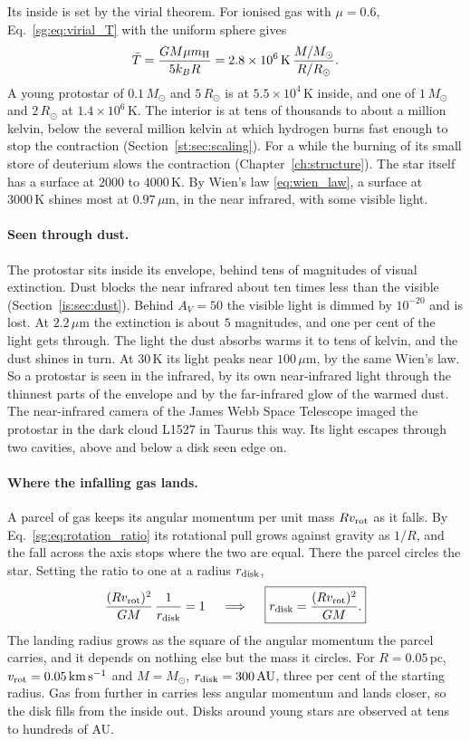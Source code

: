 Its inside is set by the virial theorem. For ionised gas with $\mu=0.6$, Eq.~\eqref{sg:eq:virial_T} with the uniform sphere gives
\[
\bar T=\frac{GM\mu m_{\rm H}}{5k_BR}=2.8\times10^6\,\mathrm K\,\frac{M/M_\odot}{R/R_\odot}.
\]
A young protostar of $0.1\,M_\odot$ and $5\,R_\odot$ is at $5.5\times10^4\,\mathrm K$ inside, and one of $1\,M_\odot$ and $2\,R_\odot$ at $1.4\times10^6\,\mathrm K$. The interior is at tens of thousands to about a million kelvin, below the several million kelvin at which hydrogen burns fast enough to stop the contraction (Section~\ref{st:sec:scaling}). For a while the burning of its small store of deuterium slows the contraction (Chapter~\ref{ch:structure}). The star itself has a surface at $2000$ to $4000\,\mathrm K$. By Wien's law \eqref{eq:wien_law}, a surface at $3000\,\mathrm K$ shines most at $0.97\,\mu\mathrm m$, in the near infrared, with some visible light.

\paragraph{Seen through dust.} The protostar sits inside its envelope, behind tens of magnitudes of visual extinction. Dust blocks the near infrared about ten times less than the visible (Section~\ref{is:sec:dust}). Behind $A_V=50$ the visible light is dimmed by $10^{-20}$ and is lost. At $2.2\,\mu\mathrm m$ the extinction is about $5$ magnitudes, and one per cent of the light gets through. The light the dust absorbs warms it to tens of kelvin, and the dust shines in turn. At $30\,\mathrm K$ its light peaks near $100\,\mu\mathrm m$, by the same Wien's law. So a protostar is seen in the infrared, by its own near-infrared light through the thinnest parts of the envelope and by the far-infrared glow of the warmed dust. The near-infrared camera of the James Webb Space Telescope imaged the protostar in the dark cloud L1527 in Taurus this way. Its light escapes through two cavities, above and below a disk seen edge on.

\paragraph{Where the infalling gas lands.} A parcel of gas keeps its angular momentum per unit mass $Rv_{\rm rot}$ as it falls. By Eq.~\eqref{sg:eq:rotation_ratio} its rotational pull grows against gravity as $1/R$, and the fall across the axis stops where the two are equal. There the parcel circles the star. Setting the ratio to one at a radius $r_{\rm disk}$,
\begin{equation}
	\frac{(Rv_{\rm rot})^2}{GM}\,\frac{1}{r_{\rm disk}}=1
	\quad\implies\quad
	\boxed{r_{\rm disk}=\frac{(Rv_{\rm rot})^2}{GM}.}
	\label{sg:eq:r_disk}
\end{equation}
The landing radius grows as the square of the angular momentum the parcel carries, and it depends on nothing else but the mass it circles. For $R=0.05\,\mathrm{pc}$, $v_{\rm rot}=0.05\,\mathrm{km\,s^{-1}}$ and $M=M_\odot$, $r_{\rm disk}=300\,\mathrm{AU}$, three per cent of the starting radius. Gas from further in carries less angular momentum and lands closer, so the disk fills from the inside out. Disks around young stars are observed at tens to hundreds of AU.

